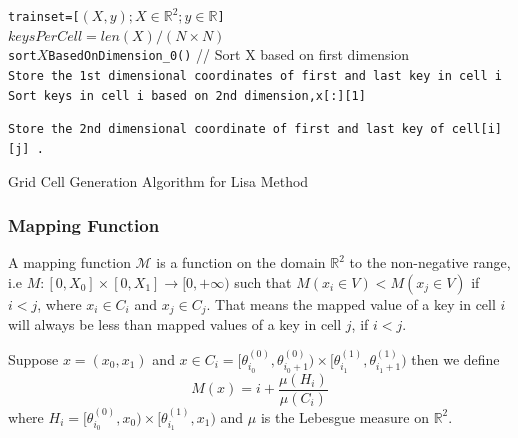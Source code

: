 \begin{algorithm}[H]
    \SetAlgoLined
     \texttt{trainset=[$(X,y);X \in \mathbb{R}^{2};y \in \mathbb{R}$]} \\
     \texttt{$keysPerCell =  len(X) \slash (N \times N) $}\\
     \texttt{sort$X$BasedOnDimension\_0()} // Sort X based on first dimension \\
     {
        \texttt{Store the 1st dimensional coordinates of first and last key in cell i} \\
        \texttt{Sort keys in cell i based on 2nd dimension,x[:][1] }\\
     }
     
    
     
      {
         {
            \texttt{Store the 2nd dimensional coordinate of first and last key of cell[i][j] .} \\
		 }
      }
     \caption{Grid Cell Generation Algorithm for Lisa Method}
     \label{Training_Lisa_Baseline}
\end{algorithm}

\subsubsection{Mapping Function}
\label{sssec:Mapping_Function}
A mapping function $\mathcal{M}$ is a function on the domain $\mathbb{R}^{2}$ to the non-negative range, i.e $M:[0,X_{0}]\times[0,X_{1}]\to [0,+\infty)$ such that
    $ M(x_{i} \in V) <  M(x_{j} \in V)$ if $i<j$, where $x_{i} \in C_{i}$ and $x_{j} \in C_{j}$. That means the mapped value of a key in cell $i$ will always be less than mapped values of a key in cell $j$, if $i <j$. 
    
Suppose $x = (x_{0}, x_{1})$ and $x \in C_{i} = [\theta^{(0)}_{i_0},\theta^{(0)}_{i_0+1}) \times [\theta^{(1)}_{i_1},\theta^{(1)}_{i_1+1}) $ then we define 
$$M(x) = i+ \frac {\mu(H_{i})}{\mu(C_{i})} $$ where $H_{i} = [\theta^{(0)}_{i_0},x_{0}) \times [\theta^{(1)}_{i_1},x_{1}) $ and $\mu$ is the Lebesgue measure on $\mathbb{R}^2$.

